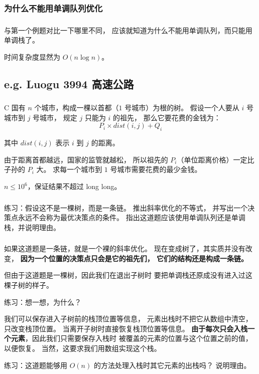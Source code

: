 \documentclass[9pt, UTF8]{beamer} %
\newcommand \fts {\frametitle{\insertsubsection}}
\newcommand \ftss {\frametitle{\insertsubsubsection}}
\newcommand \bpause { \bigskip \pause }
\begin{document}
	\subsubsection{为什么不能用单调队列优化}

	\begin{frame}
		\ftss

		与第一个例题对比一下哪里不同，
		应该就知道为什么不能用单调队列，而只能用单调栈了。

		时间复杂度显然为 $O(n \log n)$。
	\end{frame}

	\subsection {e.g. Luogu 3994 高速公路}

	\begin{frame}
		\fts

		C 国有 $n$ 个城市，构成一棵以首都（$1$ 号城市）为根的树。
		假设一个人要从 $i$ 号城市到 $j$ 号城市，
		规定 $j$ 只能为 $i$ 的祖先，
		那么它要花费的金钱为：
		$$
		P_i \times dist(i, j) + Q_i
		$$

		其中 $dist(i, j)$ 表示 $i$ 到 $j$ 的距离。

		由于距离首都越远，国家的监管就越松，
		所以祖先的 $P_i$（单位距离价格）一定比子孙的 $P_i$ 大。
		求每一个城市到 $1$ 号城市需要花费的最少金钱。

		\bigskip

		$n \le 10^6$，保证结果不超过 long long。
	\end{frame}

	\begin{frame}
		\fts

		练习：假设这不是一棵树，而是一条链。
		推出斜率优化的不等式，
		并写出一个决策点永远不会称为最优决策点的条件。
		指出这道题应该使用单调队列还是单调栈，并说明理由。
	\end{frame}

	\begin{frame}
		\fts

		如果这道题是一条链，就是一个裸的斜率优化。
		现在变成树了，其实质并没有改变，
		\textbf{因为一个位置的决策点只会是它的祖先们，
		它们的结构还是构成一条链。}

		\bpause

		但由于这道题是一棵树，因此我们在退出子树时
		要把单调栈还原成没有进入过这棵子树的样子。

		练习：想一想，为什么？

		\bpause

		我们可以保存进入子树前的栈顶位置等信息，
		元素出栈时不把它从数组中清空，只改变栈顶位置。
		当离开子树时直接恢复栈顶位置等信息。
		\textbf{由于每次只会入栈一个元素}，因此我们只需要保存入栈时
		被覆盖的元素的位置与这个位置之前的值，以便恢复。
		当然，这要求我们用数组实现这个栈。

		练习：这道题能够用 $O(n)$ 的方法处理入栈时其它元素的出栈吗？
		说明理由。
	\end{frame}
\end{document}
